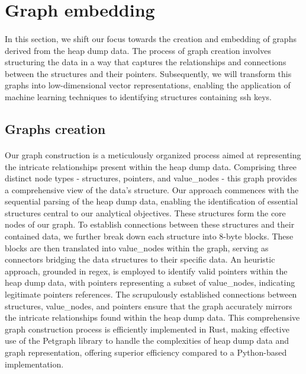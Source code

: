 \section{Graph embedding}\label{sec:embedding:graph_embedding}
    \paragraph{}In this section, we shift our focus towards the creation and embedding of graphs derived from the heap dump data. The process of graph creation involves structuring the data in a way that captures the relationships and connections between the \glspl{structure} and their \glspl{pointer}. Subsequently, we will transform this graphs into low-dimensional vector representations, enabling the application of machine learning techniques to identifying \glspl{structure} containing ssh keys.

    \subsection{Graphs creation}
        \paragraph{}Our graph construction is a meticulously organized process aimed at representing the intricate relationships present within the heap dump data. Comprising three distinct node types - \glspl{structure}, \glspl{pointer}, and \glspl{value_node} - this graph provides a comprehensive view of the data's structure. Our approach commences with the sequential parsing of the heap dump data, enabling the identification of essential \glspl{structure} central to our analytical objectives. These \glspl{structure} form the core nodes of our graph. To establish connections between these \glspl{structure} and their contained data, we further break down each structure into 8-byte blocks. These blocks are then translated into \glspl{value_node} within the graph, serving as connectors bridging the data structures to their specific data. An heuristic approach, grounded in \acrshort{regex}, is employed to identify valid \glspl{pointer} within the heap dump data, with \glspl{pointer} representing a subset of \glspl{value_node}, indicating legitimate \glspl{pointer} references. The scrupulously established connections between \glspl{structure}, \glspl{value_node}, and \glspl{pointer} ensure that the graph accurately mirrors the intricate relationships found within the heap dump data. This comprehensive graph construction process is efficiently implemented in Rust, making effective use of the Petgraph library to handle the complexities of heap dump data and graph representation, offering superior efficiency compared to a Python-based implementation.

